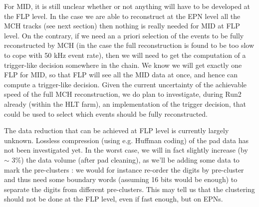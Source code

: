 For MID, it is still unclear whether or not anything will have to be
developed at the FLP level. In the case we are able to reconstruct at
the EPN level all the MCH tracks (see next section) then nothing is
really needed for MID at FLP level. On the contrary, if we need an a
priori selection of the events to be fully reconstructed by MCH (in
the case the full reconstruction is found to be too slow to cope with
50 kHz event rate), then we will need to get the computation of a
trigger-like decision somewhere in the chain. We know we will get
exactly one FLP for MID, so that FLP will see all the MID data at
once, and hence can compute a trigger-like decision. Given the current
uncertainty of the achievable speed of the full MCH reconstruction, we
do plan to investigate, during Run2 already (within the HLT farm), an
implementation of the trigger decision, that could be used to select
which events should be fully reconstructed.

The data reduction that can be achieved at FLP level is currently
largely unknown. Lossless compression (using e.g. Huffman coding) of
the pad data has not been investigated yet. In the worst case, we will
in fact slightly increase (by $\sim$ 3\%) the data volume (after pad cleaning), as we'll be
adding some data to mark the pre-clusters : we would for instance
re-order the digits by pre-cluster and thus need some boundary words (assuming 16 bits would be enough)
to separate the digits from different pre-clusters. This may tell us that the clustering
should not be done at the FLP level, even if fast enough, but on EPNs.
